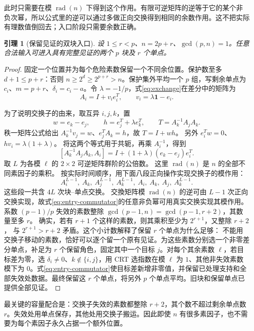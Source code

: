 \documentclass[11pt,a4paper,oneside,openany]{book}
\newcommand{\rad}{\operatorname{rad}}
\newtheorem{lemma}[theorem]{引理}
\theoremstyle{definition}
\numberwithin{equation}{chapter}
\begin{document}
此时只需要在模 $\rad(n)$ 下得到这个作用。有限可逆矩阵的逆等于它的某个非负次幂，所以公式里的逆可以通过多做正向交换得到相同的余数作用。这不把实际有理数值倒回去；入口阶段只需要余数正确。
\begin{lemma}[保留见证的双块入口]\label{lem:two-block-entry}
设 $1\le r<p$、$n=2p+r$、$\gcd(p,n)=1$。任意合法输入可进入具有完整见证的两个 $p$ 块及 $r$ 个单点。
\end{lemma}
\begin{proof}
固定一个位置并为每个危险素数保留一个不同余位置。保护数至多 $d+1\le p+r$：否则 $n\ge2^d\ge2^{p+r}>n$。保护集外平均一个 $p$ 组，写剩余单点为 $c_i$、$m=p+r$、$\delta_i=c_i-a$。令 $\lambda=-1/p$，式\eqref{eq:exchange}在差分中的矩阵为
\[
A_i=I+v_i e_i^T,\qquad v_i=\lambda\mathbf1-e_i.
\]

为了说明交换子的由来，取互异 $i,j,k$，置
\[
w=e_k-e_j,\qquad h=e_j^T+\lambda e_k^T,
\qquad T=A_k^{-1}A_jA_k.
\]
秩一矩阵公式给出 $A_k^{-1}v_j=w$、$e_j^TA_k=h$，故 $T=I+wh$。
另外 $e_i^Tw=0$、$hv_i=\lambda(1+\lambda)$。
将这两个等式用于共轭，再乘 $A_i^{-1}$，得到
\begin{equation}\label{eq:entry-commutator}
[A_k^{-1}A_jA_k,A_i]
=I+(1+\lambda)(e_k-e_j)e_i^T.
\end{equation}
取 $L$ 为各模 $\ell$ 的 $2\times2$ 可逆矩阵群阶的公倍数。
这里 $\rad(n)$ 是 $n$ 的全部不同素因子的乘积。
按实际时间顺序，用下面八段正向操作实现交换子的模作用：
\[
 A_i^{L-1},\ A_k,\ A_j^{L-1},\ A_k^{L-1},\
 A_i,\ A_k,\ A_j,\ A_k^{L-1}.
\]
这些段一共含 $4L$ 次块--单点交换。
交換矩阵模 $\rad(n)$ 的逆可由 $L-1$ 次正向交换实现，故式\eqref{eq:entry-commutator}的任意非负幂可用真实交换实现其模作用。
系数 $(p-1)/p$ 失效的素数整除 $\gcd(p-1,n)=\gcd(p-1,r+2)$，其数量至多 $r$。
确实，若有 $r+1$ 个这样的素数，则其乘积至少为 $2^{r+1}$，又整除 $r+2$，
与 $2^{r+1}>r+2$ 矛盾。这个小计数解释了保留 $r$ 个单点为什么足够：
不能用交换子移动的素数，恰好可以逐个留一个原有见证。为这些素数分别选一个非零差分单点，补足为 $r$ 个保留角色，固定其中一个目标 $j$。对每个其余素数 $\ell$，若目标差为零，选 $\delta_i\ne0$、$k\notin\{i,j\}$，用 CRT 选指数在模 $\ell$ 为 $1$、其他非失效素数模下为 $0$。式\eqref{eq:entry-commutator}使目标差新增非零值，并保留已处理支持和全部失效处数据。最终保留这 $r$ 个单点，将另外 $p$ 个单点平均。旧块和保留单点已提供全部见证。
\end{proof}
最关键的容量配合是：交换子失效的素数都整除 $r+2$，其个数不超过剩余单点数 $r$。失效处用单点保存，其他处用交换子搬运。因此即使 $n$ 有很多素因子，也不需要为每个素因子永久占据一个额外位置。
\end{document}
